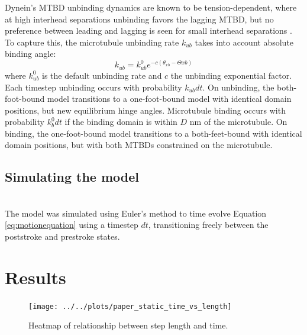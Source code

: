 \documentclass[9pt,twocolumn,twoside]{pnas-new}
\begin{document}
Dynein's MTBD unbinding dynamics are known to be tension-dependent, where at high interhead separations unbinding favors the lagging MTBD, but no preference between leading and lagging is seen for small interhead separations \cite{yildizpaper}. To capture this, the microtubule unbinding rate $k_{ub}$ takes into account absolute binding angle:
%
\begin{equation}
  k_{ub} = k_{ub}^0e^{-c\left(\theta_{xb}-\Theta{xb}\right)}
\end{equation}
%
where $k_{ub}^0$ is the default unbinding rate and $c$ the unbinding exponential factor. Each timestep unbinding occurs with probability $k_{ub}dt$. On unbinding, the both-foot-bound model transitions to a one-foot-bound model with identical domain positions, but new equilibrium hinge angles. Microtubule binding occurs with probability $k_{b}^0dt$ if the binding domain is within $D$ nm of the microtubule. On binding, the one-foot-bound model transitions to a both-feet-bound with identical domain positions, but with both MTBDs constrained on the microtubule.\\

\subsection*{Simulating the model}~\\
The model was simulated using Euler's method to time evolve Equation \ref{eq:motionequation} using a timestep $dt$, transitioning freely between the poststroke and prestroke states.

\section{Results}

\begin{figure}[tbhp]
\centering
\texttt{[image: ../../plots/paper\_static\_time\_vs\_length]}
\caption{Heatmap of relationship between step length and time.}
\label{fig:duration-length}
\end{figure}
\end{document}
